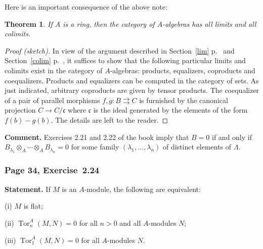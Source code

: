 \documentclass[12pt,letterpaper]{article}%
\newcommand{\oo}{\operatorname}\newcommand{\ooo}{\operatorname*}
\newcommand{\mf}{\mathfrak}
\newcommand{\ccc}{\mf c}
\newcommand{\nn}{\noindent}
\newtheorem{thm}{Theorem}%
\begin{document}
Here is an important consequence of the above note:

\begin{thm}
If $A$ is a ring, then the category of $A$-algebras has all limits and all colimits.
\end{thm}
\begin{proof}[Proof (sketch)] 
In view of the argument described in Section~\ref{lim} p.~\pageref{lim} and Section~\ref{colim} p.~\pageref{colim}, it suffices to show that the following particular limits and colimits exist in the category of $A$-algebras: products, equalizers, coproducts and coequalizers. Products and equalizers can be computed in the category of sets. As just indicated, arbitrary coproducts are given by tensor products. The coequalizer of a pair of parallel morphisms $f,g:B\rightrightarrows C$ is furnished by the canonical projection $C\to C/\ccc$ where $\ccc$ is the ideal generated by the elements of the form $f(b)-g(b)$. The details are left to the reader.%
\end{proof}

\nn\textbf{Comment.} Exercises 2.21 and 2.22 of the book imply that $B=0$ if and only if $B_{\lambda_1}\otimes_A\cdots\otimes_AB_{\lambda_n}=0$ for some family $(\lambda_1,\dots,\lambda_n)$ of distinct elements of $\Lambda$.

\subsubsection{Page 34, Exercise~2.24}%

\textbf{Statement.} If $M$ is an $A$-module, the following are equivalent: 

\nn(i) $M$ is flat;

\nn(ii) $\oo{Tor}^A_n(M,N)=0$ for all $n>0$ and all $A$-modules $N$;

\nn(iii) $\oo{Tor}^A_1(M,N)=0$ for all $A$-modules $N$.

\nn[To show that (i) $\implies$ (ii), take a free resolution of $N$ and tensor it with $M$. Since $M$ is flat, the resulting sequence is exact and therefore its homology groups, which are the $\oo{Tor}^A_n(M, N)$, are zero for $n>0$. To show that (iii) $\implies$ (i), let $0\to N'\to N\to N''\to 0$ be an exact sequence. Then, from the $\oo{Tor}$ exact sequence,
$$
\oo{Tor}^A_1(M,N'')\to M\otimes N'\to M\otimes N\to M\otimes N''\to0
$$
is exact. Since $\oo{Tor}^A_1(M,N'')=0$ it follows that $M$ is flat.]
\end{document}
